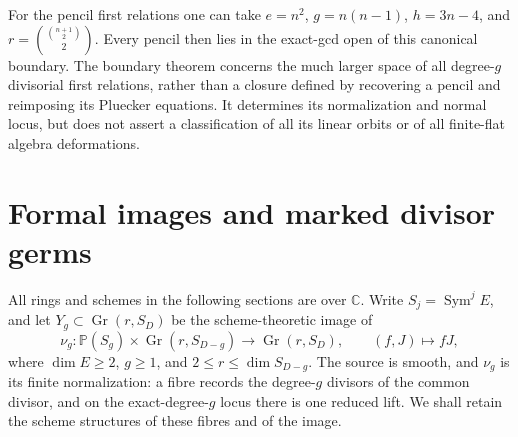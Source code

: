 \documentclass[11pt,reqno]{amsart}
\numberwithin{equation}{section}
\theoremstyle{definition}\newtheorem{definition}[theorem]{Definition}
\theoremstyle{remark}\newtheorem{remark}[theorem]{Remark}
\newcommand{\C}{\mathbb C}\newcommand{\Q}{\mathbb Q}
\newcommand{\Pj}{\mathbb P}\newcommand{\A}{\mathbb A}
\DeclareMathOperator{\Sym}{Sym}\DeclareMathOperator{\Gr}{Gr}
\begin{document}
For the pencil first relations one can take
\(e=n^2\), \(g=n(n-1)\), \(h=3n-4\), and
\(r=\binom{\binom{n+1}{2}}2\).  Every pencil then lies in the
exact-gcd open of this canonical boundary.  The boundary theorem
concerns the much larger space of all degree-\(g\) divisorial first
relations, rather than a closure defined by recovering a pencil and
reimposing its Pluecker equations.  It determines its normalization
and normal locus, but does not assert a classification of all its
linear orbits or of all finite-flat algebra deformations.

\section{Formal images and marked divisor germs}
\label{sec:formal-images-v153}
All rings and schemes in the following sections are over $\C$. Write
$S_j=\Sym^j E$, and let $Y_g\subset\Gr(r,S_D)$ be the
scheme-theoretic image of
\[
 \nu_g:\Pj(S_g)\times\Gr(r,S_{D-g})\longrightarrow\Gr(r,S_D),
 \qquad (f,J)\longmapsto fJ,
\]
where $\dim E\geq2$, $g\geq1$, and $2\leq r\leq\dim S_{D-g}$.
The source is smooth, and $\nu_g$ is its finite normalization: a fibre
records the degree-$g$ divisors of the common divisor, and on the
exact-degree-$g$ locus there is one reduced lift. We shall retain the
scheme structures of these fibres and of the image.
\end{document}
